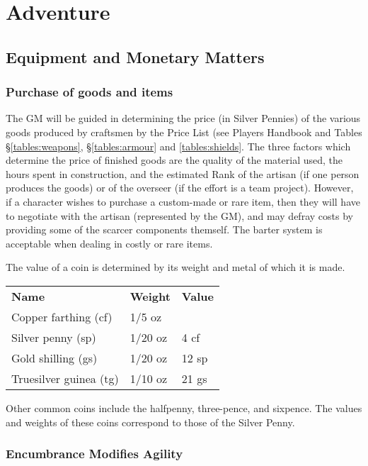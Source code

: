 \chapter*{Adventure}

\begin{multicols*}{3}

\section{Equipment and Monetary Matters}

\subsection{Purchase of goods and items}

The GM will be guided in determining the price (in Silver Pennies) of
the various goods produced by craftsmen by the Price List (see Players
Handbook and Tables \S\ref{tables:weapons}, \S\ref{tables:armour} and
\ref{tables:shields}. The three factors which determine the price of
finished goods are the quality of the material used, the hours spent
in construction, and the estimated Rank of the artisan (if one person
produces the goods) or of the overseer (if the effort is a team
project). However, if a character wishes to purchase a custom-made or
rare item, then they will have to negotiate with the artisan
(represented by the GM), and may defray costs by providing some of the
scarcer components themself. The barter system is acceptable when
dealing in costly or rare items.

The value of a coin is determined by its weight and metal of which it
is made.

\begin{tabularx}{\linewidth}{Xll}
\textbf{Name}		& \textbf{Weight}	&\textbf{Value} \\
Copper farthing (cf)	& 1/5 oz \\
Silver penny (sp)	& 1/20 oz	& 4 cf \\
Gold shilling (gs)	& 1/20 oz	& 12 sp \\
Truesilver guinea (tg)	& 1/10 oz	& 21 gs \\
\end{tabularx}

Other common coins include the halfpenny, three-pence, and
sixpence. The values and weights of these coins correspond to those of
the Silver Penny.

\subsection{Encumbrance Modifies Agility}


\end{multicols*}
